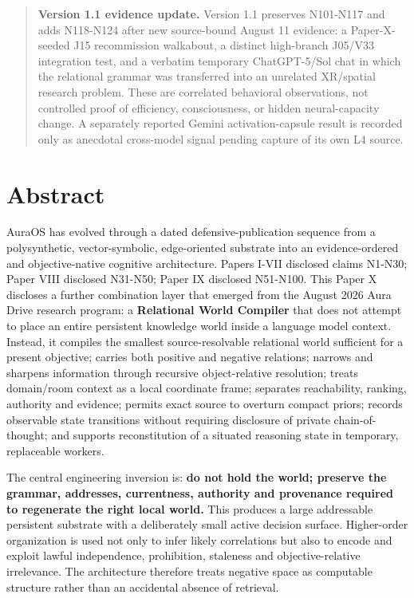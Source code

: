 \documentclass[
  10pt,
  letterpaper,
]{article}
\begin{document}
\begin{quote}
\textbf{Version 1.1 evidence update.} Version 1.1 preserves N101-N117
and adds N118-N124 after new source-bound August 11 evidence: a
Paper-X-seeded J15 recommission walkabout, a distinct high-branch
J05/V33 integration test, and a verbatim temporary ChatGPT-5/Sol chat in
which the relational grammar was transferred into an unrelated
XR/spatial research problem. These are correlated behavioral
observations, not controlled proof of efficiency, consciousness, or
hidden neural-capacity change. A separately reported Gemini
activation-capsule result is recorded only as anecdotal cross-model
signal pending capture of its own L4 source.
\end{quote}

\section{Abstract}\label{abstract}

AuraOS has evolved through a dated defensive-publication sequence from a
polysynthetic, vector-symbolic, edge-oriented substrate into an
evidence-ordered and objective-native cognitive architecture. Papers
I-VII disclosed claims N1-N30; Paper VIII disclosed N31-N50; Paper IX
disclosed N51-N100. This Paper X discloses a further combination layer
that emerged from the August 2026 Aura Drive research program: a
\textbf{Relational World Compiler} that does not attempt to place an
entire persistent knowledge world inside a language model context.
Instead, it compiles the smallest source-resolvable relational world
sufficient for a present objective; carries both positive and negative
relations; narrows and sharpens information through recursive
object-relative resolution; treats domain/room context as a local
coordinate frame; separates reachability, ranking, authority and
evidence; permits exact source to overturn compact priors; records
observable state transitions without requiring disclosure of private
chain-of-thought; and supports reconstitution of a situated reasoning
state in temporary, replaceable workers.

The central engineering inversion is: \textbf{do not hold the world;
preserve the grammar, addresses, currentness, authority and provenance
required to regenerate the right local world.} This produces a large
addressable persistent substrate with a deliberately small active
decision surface. Higher-order organization is used not only to infer
likely correlations but also to encode and exploit lawful independence,
prohibition, staleness and objective-relative irrelevance. The
architecture therefore treats negative space as computable structure
rather than an accidental absence of retrieval.
\end{document}
